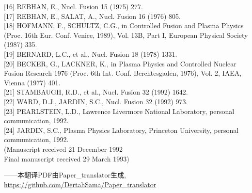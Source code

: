 \documentclass[utf8]{ctexart}
\begin{document}
\begin{sloppypar}
\textcolor{green!50!black}{[16]} REBHAN, E., Nucl. Fusion 15 (1975) 277.\\[0pt]
\textcolor{green!50!black}{[17]} REBHAN, E., SALAT, A., Nucl. Fusion 16 (1976) 805.\\[0pt]
\textcolor{green!50!black}{[18]} HOFMANN, F., SCHULTZ, C.G., in Controlled Fusion and Plasma Physics (Proc. 16th Eur. Conf. Venice, 1989), Vol. 13B, Part I, European Physical Society (1987) 335.\\[0pt]
\textcolor{green!50!black}{[19]} BERNARD, L.C., et al., Nucl. Fusion 18 (1978) 1331.\\[0pt]
\textcolor{green!50!black}{[20]} BECKER, G., LACKNER, K., in Plasma Physics and Controlled Nuclear Fusion Research 1976 (Proc. 6th Int. Conf. Berchtesgaden, 1976), Vol. 2, IAEA, Vienna (1977) 401.\\[0pt]
\textcolor{green!50!black}{[21]} STAMBAUGH, R.D., et al., Nucl. Fusion 32 (1992) 1642.\\[0pt]
\textcolor{green!50!black}{[22]} WARD, D.J., JARDIN, S.C., Nucl. Fusion 32 (1992) 973.\\[0pt]
\textcolor{green!50!black}{[23]} PEARLSTEIN, L.D., Lawrence Livermore National Laboratory, personal communication, 1992.\\[0pt]
\textcolor{green!50!black}{[24]} JARDIN, S.C., Plasma Physics Laboratory, Princeton University, personal communication, 1992.\\
(Manuscript received 21 December 1992\\
Final manuscript received 29 March 1993)

  
  \end{sloppypar}	
  \begin{flushright}
  	\vfill \footnotesize
  	——本翻译PDF由Paper_translator生成, \url{https://github.com/DertahSama/Paper_translator}
  \end{flushright}
  
\end{document}
